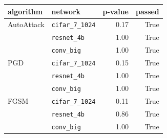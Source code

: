 \begin{tabular}{llrr}
\toprule
algorithm & network & p-value & passed \\
\midrule
AutoAttack & \texttt{cifar\_7\_1024} & 0.17 & True \\
 & \texttt{resnet\_4b} & 1.00 & True \\
 & \texttt{conv\_big} & 1.00 & True \\
PGD & \texttt{cifar\_7\_1024} & 0.15 & True \\
 & \texttt{resnet\_4b} & 1.00 & True \\
 & \texttt{conv\_big} & 1.00 & True \\
FGSM & \texttt{cifar\_7\_1024} & 0.11 & True \\
 & \texttt{resnet\_4b} & 0.86 & True \\
 & \texttt{conv\_big} & 1.00 & True \\
\bottomrule
\end{tabular}
